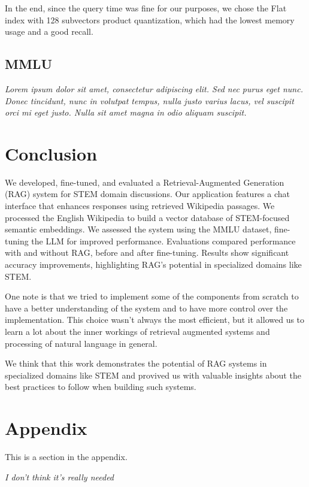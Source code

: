 \documentclass[11pt]{article}
\begin{document}
In the end, since the query time was fine for our purposes, we chose the Flat index with 128
subvectors product quantization, which had the lowest memory usage and a good recall.


\subsection{MMLU}
\textit{Lorem ipsum dolor sit amet, consectetur adipiscing elit. Sed nec purus eget
nunc. Donec tincidunt, nunc in volutpat tempus, nulla justo varius lacus, vel
suscipit orci mi eget justo. Nulla sit amet magna in odio aliquam suscipit.}

\section{Conclusion}
We developed, fine-tuned, and evaluated a Retrieval-Augmented Generation (RAG) 
system for STEM domain discussions. Our application features a chat interface 
that enhances responses using retrieved Wikipedia passages. We processed the 
English Wikipedia to build a vector database of STEM-focused semantic 
embeddings. 
We assessed the system using the MMLU 
dataset, fine-tuning the LLM for improved performance. Evaluations compared 
performance with and without RAG, before and after fine-tuning.
Results show significant accuracy improvements, highlighting RAG's potential 
in specialized domains like STEM.

One note is that we tried to implement some of the components from scratch
to have a better understanding of the system and to have more control over the
implementation.
This choice wasn't always the most efficient, but it allowed us to learn a lot
about the inner workings of retrieval augmented systems and processing of natural 
language in general. 

We think that this work demonstrates the potential of RAG systems in specialized 
domains like STEM and provived us with valuable insights about the best practices 
to follow when building such systems.

\newpage



\nocite{*}

\appendix

\section{Appendix}
\label{sec:appendix}

This is a section in the appendix.

\textit{I don't think it's really needed}
\end{document}
